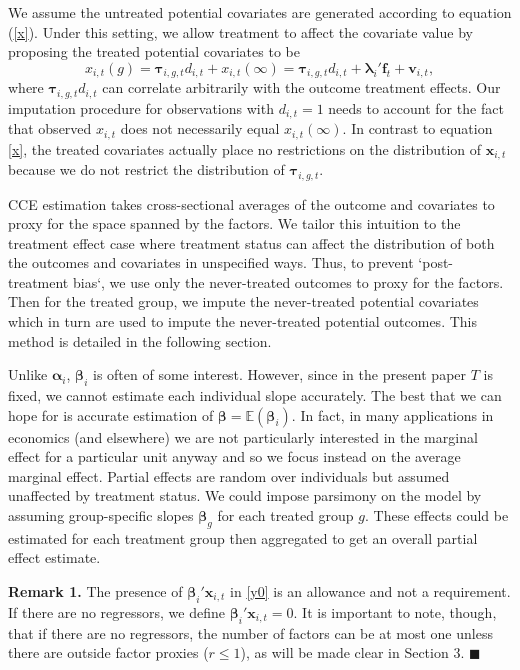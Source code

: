 \documentclass[12pt,fleqn]{article}
\def\*#1{\mathbf{#1}}
\def\+#1{\boldsymbol{#1}}
\begin{document}
We assume the untreated potential covariates are generated according to equation (\ref{x}). Under this setting, we allow treatment to affect the covariate value by proposing the treated potential covariates to be
\begin{equation}
    x_{i,t}(g) = \+\tau_{i,g,t} d_{i,t} + x_{i,t}(\infty) = \+\tau_{i,g,t} d_{i,t} + \+\lambda_i'\*f_t + \*v_{i,t}, \label{observed x}
\end{equation}
where $\+\tau_{i,g,t} d_{i,t}$ can correlate arbitrarily with the outcome treatment effects. Our imputation procedure for observations with $d_{i,t} = 1$ needs to account for the fact that observed $x_{i,t}$ does not necessarily equal $x_{i,t}(\infty)$. In contrast to equation \eqref{x}, the treated covariates actually place no restrictions on the distribution of $\*x_{i,t}$ because we do not restrict the distribution of $\+\tau_{i,g,t}$.

CCE estimation takes cross-sectional averages of the outcome and covariates to proxy for the space spanned by the factors. We tailor this intuition to the treatment effect case where treatment status can affect the distribution of both the outcomes and covariates in unspecified ways. Thus, to prevent `post-treatment bias`, we use only the never-treated outcomes to proxy for the factors. Then for the treated group, we impute the never-treated potential covariates which in turn are used to impute the never-treated potential outcomes. This method is detailed in the following section.

Unlike $\+\alpha_i$, $\+\beta_i$ is often of some interest. However, since in the present paper $T$ is fixed, we cannot estimate each individual slope accurately. The best that we can hope for is accurate estimation of $\+\beta = \mathbb{E}(\+\beta_i)$. In fact, in many applications in economics (and elsewhere) we are not particularly interested in the marginal effect for a particular unit anyway and so we focus instead on the average marginal effect. Partial effects are random over individuals but assumed unaffected by treatment status. We could impose parsimony on the model by assuming group-specific slopes $\+\beta_g$ for each treated group $g$. These effects could be estimated for each treatment group then aggregated to get an overall partial effect estimate.

\bigskip

\noindent \textbf{Remark 1.} The presence of $\+\beta_i'\*x_{i,t}$ in \eqref{y0} is an allowance and not a requirement. If there are no regressors, we define $\+\beta_i'\*x_{i,t} = 0$. It is important to note, though, that if there are no regressors, the number of factors can be at most one unless there are outside factor proxies ($r \leq 1$), as will be made clear in Section 3. $\blacksquare$
\end{document}
